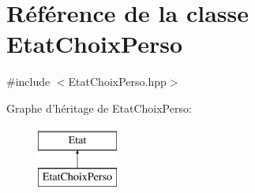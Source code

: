 \hypertarget{class_etat_choix_perso}{\section{Référence de la classe Etat\-Choix\-Perso}
\label{class_etat_choix_perso}
}


{\ttfamily \#include $<$Etat\-Choix\-Perso.\-hpp$>$}

Graphe d'héritage de Etat\-Choix\-Perso\-:\begin{figure}[H]
\begin{center}
\leavevmode
\includegraphics[height=2.000000cm]{class_etat_choix_perso}
\end{center}
\end{figure}
